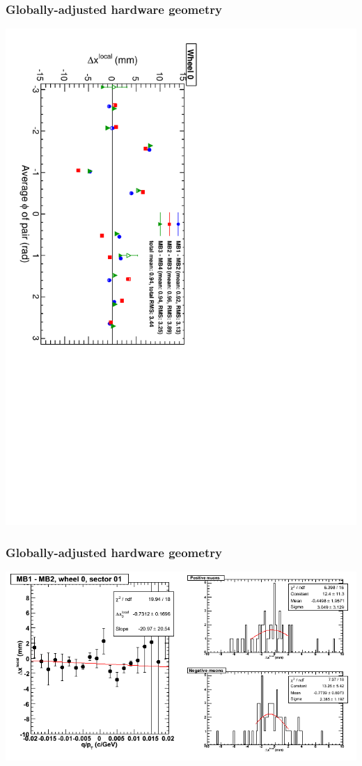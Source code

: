 \documentclass[compress]{beamer}
\begin{document}
\begin{frame}
\frametitle{Globally-adjusted hardware geometry}
\includegraphics[height=\linewidth, angle=90]{NOV4_segdiff_HW_x_whze.pdf}
\end{frame}

\begin{frame}
\frametitle{Globally-adjusted hardware geometry}
\includegraphics[width=\linewidth]{NOV4_segdiffs_HW/dt13_resid_C_01_12.png}
\end{frame}
\end{document}
